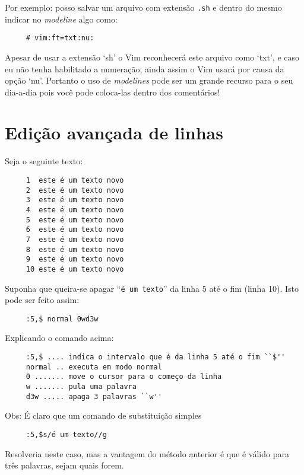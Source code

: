 Por exemplo: posso salvar um arquivo com extensão \verb|.sh| e dentro do
mesmo indicar no {\em modeline} algo como:

\begin{verbatim}
     # vim:ft=txt:nu:
\end{verbatim}

Apesar de usar a extensão `sh' o Vim reconhecerá este arquivo como `txt', e
caso eu não tenha habilitado a numeração, ainda assim o Vim usará por causa da
opção `nu'.  Portanto o uso de {\em modelines} pode ser um grande recurso para o seu
dia-a-dia pois você pode coloca-las dentro dos comentários!

\section{Edição avançada de linhas}

Seja o seguinte texto:

\begin{verbatim}
     1  este é um texto novo
     2  este é um texto novo
     3  este é um texto novo
     4  este é um texto novo
     5  este é um texto novo
     6  este é um texto novo
     7  este é um texto novo
     8  este é um texto novo
     9  este é um texto novo
     10 este é um texto novo
\end{verbatim}

Suponha que queira-se apagar ``{\tt é um texto}'' da linha 5 até o fim (linha 10). Isto pode ser feito
assim:

\begin{verbatim}
     :5,$ normal 0wd3w
\end{verbatim}

Explicando o comando acima:

\begin{verbatim}
     :5,$ .... indica o intervalo que é da linha 5 até o fim ``$''
     normal .. executa em modo normal
     0 ....... move o cursor para o começo da linha
     w ....... pula uma palavra
     d3w ..... apaga 3 palavras ``w''
\end{verbatim}

Obs: É claro que um comando de substituição simples

\begin{verbatim}
     :5,$s/é um texto//g
\end{verbatim}

Resolveria neste caso, mas a vantagem do método anterior é que
é válido para três palavras, sejam quais forem.\\

